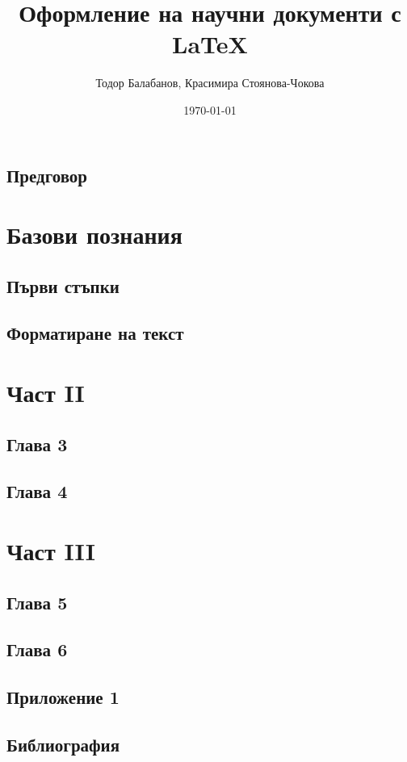 \documentclass{book}
\title{Оформление на научни документи с LaTeX}
\author{Тодор Балабанов, Красимира Стоянова-Чокова}
\date{\today}
\begin{document}
\maketitle

\frontmatter

\tableofcontents
\listoffigures
\lstlistoflistings

\mainmatter

\chapter*{Предговор}


\part{Базови познания}

\chapter{Първи стъпки}


\chapter{Форматиране на текст}


\part{Част II}

\chapter{Глава 3}

\chapter{Глава 4}

\part{Част III}

\chapter{Глава 5}

\chapter{Глава 6}

\appendix

\chapter{Приложение 1}

\backmatter

\chapter{Библиография}

\end{document}
